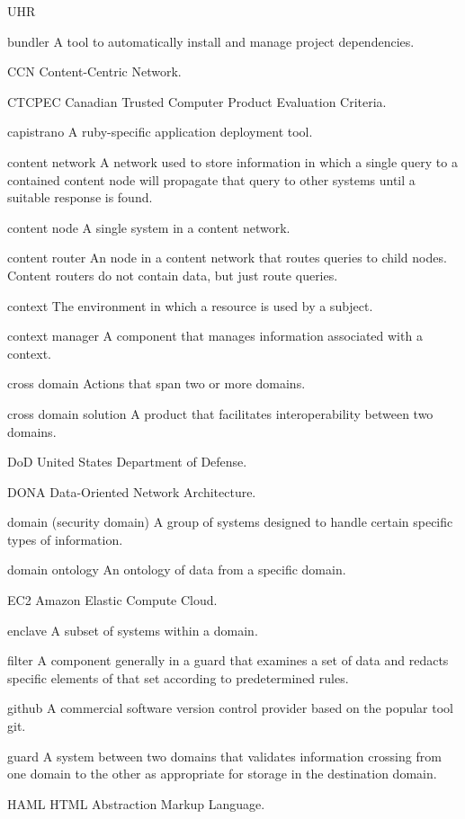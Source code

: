\documentclass[botnum,fleqn,final]{unmeethesis}
\begin{document}
\begin{glossary}{UHR}
\item[bundler] A tool to automatically install and manage project dependencies.
\item[CCN] Content-Centric Network.
\item[CTCPEC] Canadian Trusted Computer Product Evaluation Criteria.
\item[capistrano] A ruby-specific application deployment tool.
\item[content network] A network used to store information in which a single query to a contained content node will propagate that query to other systems until a suitable response is found.
\item[content node] A single system in a content network.
\item[content router] An node in a content network that routes queries to child nodes.  Content routers do not contain data, but just route queries.
\item[context] The environment in which a resource is used by a subject.
\item[context manager] A component that manages information associated with a context.
\item[cross domain] Actions that span two or more domains.
\item[cross domain solution] A product that facilitates interoperability between two domains.
\item[DoD] United States Department of Defense.
\item[DONA] Data-Oriented Network Architecture.
\item[domain (security domain)] A group of systems designed to handle certain specific types of information.
\item[domain ontology] An ontology of data from a specific domain.
\item[EC2] Amazon Elastic Compute Cloud.
\item[enclave] A subset of systems within a domain.
\item[filter] A component generally in a guard that examines a set of data and redacts specific elements of that set according to predetermined rules.
\item[github] A commercial software version control provider based on the popular tool git.
\item[guard] A system between two domains that validates information crossing from one domain to the other as appropriate for storage in the destination domain.
\item[HAML] HTML Abstraction Markup Language.

\end{glossary}
\end{document}
